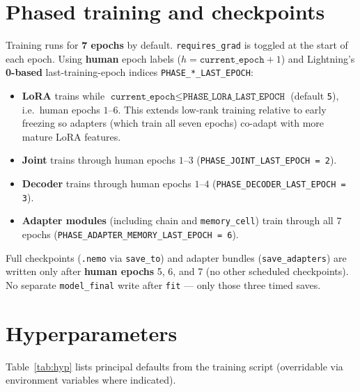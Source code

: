 \documentclass[11pt,a4paper]{article}
\begin{document}
\section{Phased training and checkpoints}
\label{sec:phased}

Training runs for \textbf{7 epochs} by default. \texttt{requires\_grad} is toggled at the start of each epoch. Using \textbf{human} epoch labels ($h = \texttt{current\_epoch} + 1$) and Lightning's \textbf{0-based} last-training-epoch indices \texttt{PHASE\_*\_LAST\_EPOCH}:

\begin{itemize}
  \item \textbf{LoRA} trains while $\texttt{current\_epoch} \leq \texttt{PHASE\_LORA\_LAST\_EPOCH}$ (default \texttt{5}), i.e.\ human epochs $1$--$6$. This extends low-rank training relative to early freezing so adapters (which train all seven epochs) co-adapt with more mature LoRA features.
  \item \textbf{Joint} trains through human epochs $1$--$3$ (\texttt{PHASE\_JOINT\_LAST\_EPOCH = 2}).
  \item \textbf{Decoder} trains through human epochs $1$--$4$ (\texttt{PHASE\_DECODER\_LAST\_EPOCH = 3}).
  \item \textbf{Adapter modules} (including chain and \texttt{memory\_cell}) train through all $7$ epochs (\texttt{PHASE\_ADAPTER\_MEMORY\_LAST\_EPOCH = 6}).
\end{itemize}

Full checkpoints (\texttt{.nemo} via \texttt{save\_to}) and adapter bundles (\texttt{save\_adapters}) are written only after \textbf{human epochs} 5, 6, and 7 (no other scheduled checkpoints). No separate \texttt{model\_final} write after \texttt{fit} --- only those three timed saves.

\section{Hyperparameters}
\label{sec:hyper}

Table~\ref{tab:hyp} lists principal defaults from the training script (overridable via environment variables where indicated).
\end{document}
